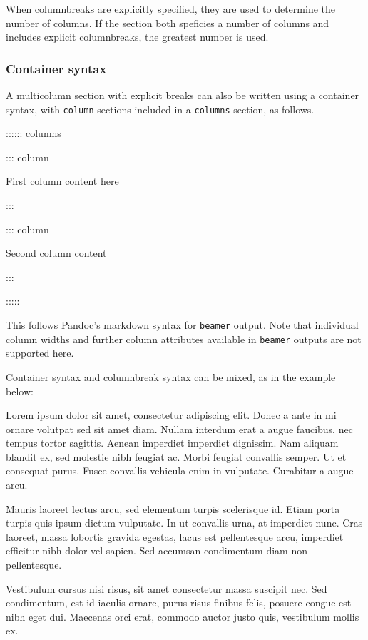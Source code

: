 \documentclass[
]{article}
\newenvironment{Shaded}{}{}
\newcommand{\NormalTok}[1]{#1}
\begin{document}
When columnbreaks are explicitly specified, they are used to determine
the number of columns. If the section both speficies a number of columns
and includes explicit columnbreaks, the greatest number is used.

\hypertarget{container-syntax}{%
\subsubsection{Container syntax}\label{container-syntax}}

A multicolumn section with explicit breaks can also be written using a
container syntax, with \texttt{column} sections included in a
\texttt{columns} section, as follows.

\begin{Shaded}
\begin{Highlighting}[]
\NormalTok{:::::: columns}

\NormalTok{::: column}

\NormalTok{First column content here}

\NormalTok{:::}

\NormalTok{::: column}

\NormalTok{Second column content}

\NormalTok{:::}

\NormalTok{:::::}
\end{Highlighting}
\end{Shaded}

This follows \href{https://pandoc.org/MANUAL.html\#columns}{Pandoc's
markdown syntax for \texttt{beamer} output}. Note that individual column
widths and further column attributes available in \texttt{beamer}
outputs are not supported here.

Container syntax and columnbreak syntax can be mixed, as in the example
below:

{\raggedcolumns\begin{multicols}{3}

Lorem ipsum dolor sit amet, consectetur adipiscing elit. Donec a ante in
mi ornare volutpat sed sit amet diam. Nullam interdum erat a augue
faucibus, nec tempus tortor sagittis. Aenean imperdiet imperdiet
dignissim. Nam aliquam blandit ex, sed molestie nibh feugiat ac. Morbi
feugiat convallis semper. Ut et consequat purus. Fusce convallis
vehicula enim in vulputate. Curabitur a augue arcu.

\columnbreak

Mauris laoreet lectus arcu, sed elementum turpis scelerisque id. Etiam
porta turpis quis ipsum dictum vulputate. In ut convallis urna, at
imperdiet nunc. Cras laoreet, massa lobortis gravida egestas, lacus est
pellentesque arcu, imperdiet efficitur nibh dolor vel sapien. Sed
accumsan condimentum diam non pellentesque.

\columnbreak

Vestibulum cursus nisi risus, sit amet consectetur massa suscipit nec.
Sed condimentum, est id iaculis ornare, purus risus finibus felis,
posuere congue est nibh eget dui. Maecenas orci erat, commodo auctor
justo quis, vestibulum mollis ex.

\end{multicols}
}
\end{document}
